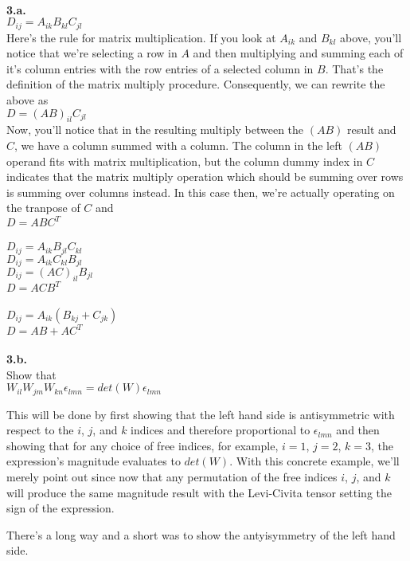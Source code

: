 \documentclass[prb,preprint]
{revtex4-1}
\newcommand{\PRLsep}{\noindent\makebox[\linewidth]{\resizebox{0.8888\linewidth}{2pt}{$\bullet$}}\bigskip}
\begin{document}
\PRLsep
\\
\newpage
\bigskip
{\bf 3.a.}
\\
$D_{ij} = A_{ik} B_{kl} C_{jl}$
\\
Here's the rule for matrix multiplication.  If you look at $A_{ik}$ and $B_{kl}$ above, you'll notice that we're selecting a row in $A$ and then multiplying and summing each of it's column entries with the row entries of a selected column in $B$.  That's the definition of the matrix multiply procedure.  Consequently, we can rewrite the above as 
\\
$D = \left(AB\right)_{il} C_{jl}$
\\
Now, you'll notice that in the resulting multiply between the $\left(AB\right)$ result and $C$, we have a column summed with a column.  The column in the left $\left(AB\right)$ operand fits with matrix multiplication, but the column dummy index in $C$ indicates that the matrix multiply operation which should be summing over rows is summing over columns instead.  In this case then, we're actually operating on the tranpose of $C$ and 
\\
$D = ABC^T$
\\
\PRLsep
\\
$D_{ij} = A_{ik} B_{jl} C_{kl}$
\\
$D_{ij} = A_{ik} C_{kl} B_{jl}$
\\
$D_{ij} = \left(AC\right)_{il} B_{jl}$
\\
$D = ACB^T$
\\
\PRLsep
\\
$D_{ij} = A_{ik} \left(B_{kj} + C_{jk}\right)$
\\
$D = AB + AC^T$
\\
\PRLsep
\\
{\bf 3.b.}  
\\
Show that 
\\
$W_{il}W_{jm}W_{kn}\epsilon_{lmn} = det\left(W\right)\epsilon_{lmn}$

This will be done by first showing that the left hand side is antisymmetric with respect to the $i$, $j$, and $k$ indices and therefore proportional to $\epsilon_{lmn}$ and then showing that for any choice of free indices, for example, $i=1$, $j=2$, $k=3$, the expression's magnitude evaluates to  $det\left(W\right)$.  With this concrete example, we'll merely point out since now that any permutation of the free indices $i$, $j$, and $k$ will produce the same magnitude result with the Levi-Civita tensor setting the sign of the expression.

There's a long way and a short was to show the antyisymmetry of the left hand side.\\
\end{document}
